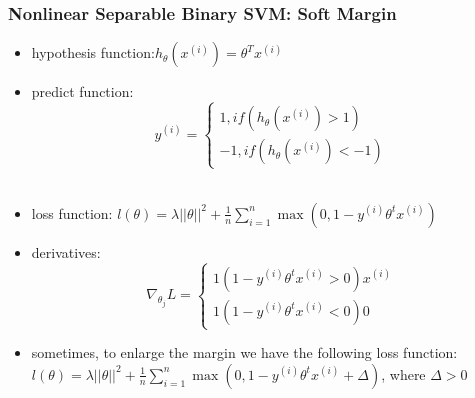 \begin{frame}
\frametitle{Nonlinear Separable Binary SVM: Soft Margin}
	\small
	\begin{itemize}
		\item hypothesis function:$h_{\theta}(x^{(i)})=\theta^Tx^{(i)}$\\
		\item predict function:
			\begin{equation*}
				y^{(i)}=
				\left\{
					\begin{aligned}
						1, if(h_{\theta}(x^{(i)}) > 1)\\
						-1, if( h_{\theta}(x^{(i)}) < -1)
					\end{aligned}
				\right.
			\end{equation*}\\
		\item loss function: 
			$l(\theta)=\lambda||\theta||^2+\frac{1}{n}\sum_{i=1}^n\max(0,1-y^{(i)}\theta^tx^{(i)})$ 
		\item derivatives:
				\begin{equation*}
					\nabla_{\theta_j} L=
					\left\{
						\begin{aligned}
							1(
								1
								-y^{(i)}\theta^tx^{(i)}
								 > 0
							)x^{(i)}\\	
							1(
								1
								-y^{(i)}\theta^tx^{(i)}
								 < 0
							)0
						\end{aligned}
					\right.
				\end{equation*}
		\item sometimes, to enlarge the margin we have the following loss function:\\
			$l(\theta)=\lambda||\theta||^2+\frac{1}{n}\sum_{i=1}^n\max(0,1-y^{(i)}\theta^tx^{(i)}+\Delta)$, where $\Delta>0$
	\end{itemize}
\end{frame}
